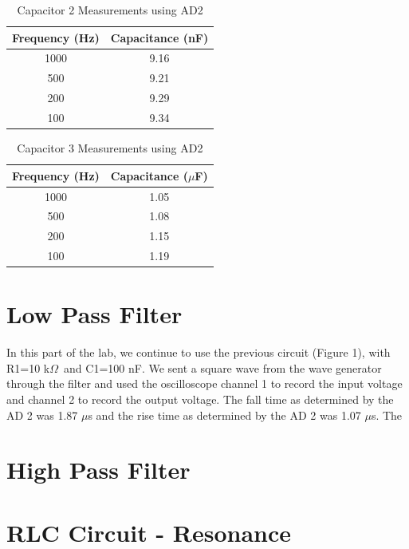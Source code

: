 \documentclass{article}
\renewcommand{\O}{\(\Omega\)}
\begin{document}
\begin{table}[H]
    \centering
    \begin{tabular}{c|c}
        Frequency (Hz) & Capacitance (nF)\\
        \hline
        1000 & 9.16\\
        500 & 9.21\\
        200 & 9.29\\
        100 & 9.34
    \end{tabular}
    \caption{Capacitor 2 Measurements using AD2}
\end{table}

\begin{table}[H]
    \centering
    \begin{tabular}{c|c}
        Frequency (Hz) & Capacitance (\(\mu\)F)\\
        \hline
        1000 & 1.05\\
        500 & 1.08\\
        200 & 1.15\\
        100 & 1.19
    \end{tabular}
    \caption{Capacitor 3 Measurements using AD2}
\end{table}

\section{Low Pass Filter}
In this part of the lab, we continue to use the previous circuit (Figure 1), with R1=10 k\O\ and C1=100 nF. We sent a square wave from the wave generator through the filter and used the oscilloscope channel 1 to record the input voltage and channel 2 to record the output voltage. The fall time as determined by the AD 2 was 1.87 \(\mu\)s and the rise time as determined by the AD 2 was 1.07 \(\mu\)s. The 

\section{High Pass Filter}


\section{RLC Circuit - Resonance}
\end{document}
